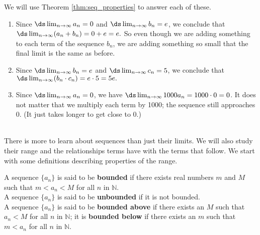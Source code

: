 {We will use Theorem \ref{thm:seq_properties} to answer each of these.
\begin{enumerate} 
\item		Since $\ds \lim_{n\to\infty} a_n = 0$ and $\ds \lim_{n\to\infty} b_n = e$, we conclude that $\ds \lim_{n\to\infty} (a_n+b_n) = 0+e = e.$ So even though we are adding something to each term of the sequence $b_n$, we are adding something so small that the final limit is the same as before.

\item		Since $\ds \lim_{n\to\infty} b_n = e$ and $\ds \lim_{n\to\infty} c_n = 5$, we conclude that $\ds \lim_{n\to\infty} (b_n\cdot c_n) = e\cdot 5 = 5e.$

\item		Since $\ds \lim_{n\to\infty} a_n = 0$, we have $\ds \lim_{n\to\infty} 1000a_n =1000\cdot 0 = 0$. It does not matter that we multiply each term by 1000; the sequence still approaches 0. (It just takes longer to get close to 0.)
\end{enumerate}
\baselineskip
}\\

There is more to learn about sequences than just their limits. We will also study their range and the relationships terms have with the terms that follow. We start with some definitions describing properties of the range.

{A sequence $\{a_n\}$ is said to be \textbf{bounded} if there exists real numbers $m$ and $M$ such that $m < a_n < M$ for all $n$ in $\mathbb{N}$.\\

A sequence $\{a_n\}$ is said to be \textbf{unbounded} if it is not bounded.\\

A sequence $\{a_n\}$ is said to be \textbf{bounded above} if there exists an $M$ such that $a_n < M$ for all $n$ in $\mathbb{N}$; it is \textbf{bounded below} if there exists an $m$ such that $m<a_n$ for all $n$ in $\mathbb{N}$.
}

